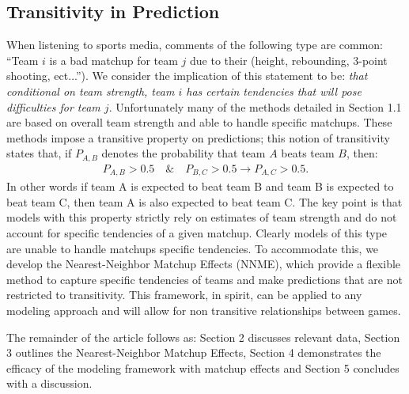 \documentclass[letterpaper,12pt]{article}
\begin{document}
\subsection{Transitivity in Prediction}
When listening to sports media, comments of the following type are common: ``Team $i$ is a bad matchup for team $j$ due to their (height, rebounding, 3-point shooting, ect...''). We consider the implication of this statement to be: \emph{that conditional on team strength, team $i$ has certain tendencies that will pose difficulties for team $j$}. Unfortunately many of the methods detailed in Section 1.1 are based on overall team strength and able to handle specific matchups. These methods impose a transitive property on predictions; this notion of transitivity states that, if $P_{A,B}$ denotes the probability that team $A$ beats team $B$, then: 
\begin{eqnarray}
P_{A,B} > 0.5 \quad \& \quad P_{B,C} > 0.5 \rightarrow P_{A,C} > 0.5.
\label{eq:trans}
\end{eqnarray}
In other words if team A is expected to beat team B and team B is expected to beat team C, then team A is also expected to beat team C. The key point is that models with this property strictly rely on estimates of team strength and do not account for specific tendencies of a given matchup. Clearly models of this type are unable to handle matchups specific tendencies. To accommodate this, we develop the Nearest-Neighbor Matchup Effects (NNME), which provide a flexible method to capture specific tendencies of teams and make predictions that are not restricted to transitivity. This framework, in spirit, can be applied to any modeling approach and will allow for non transitive relationships between games.

The remainder of the article follows as: Section 2 discusses relevant data, Section 3 outlines the Nearest-Neighbor Matchup Effects, Section 4 demonstrates the efficacy of the modeling framework with matchup effects and Section 5 concludes with a discussion.
\end{document}
